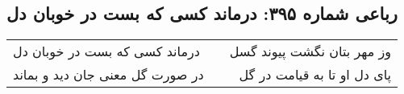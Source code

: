 \begin{center}
\section*{رباعی شماره ۳۹۵: درماند کسی که بست در خوبان دل}
\label{sec:sh395}
\begin{longtable}{l p{0.5cm} r}
درماند کسی که بست در خوبان دل
&&
وز مهر بتان نگشت پیوند گسل
\\
در صورت گل معنی جان دید و بماند
&&
پای دل او تا به قیامت در گل
\\
\end{longtable}
\end{center}
